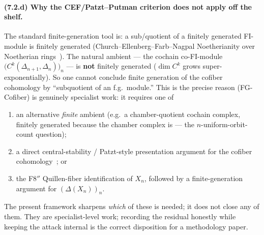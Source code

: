 \documentclass[11pt,reqno]{amsart}
\theoremstyle{plain}
\theoremstyle{definition}
\newcommand{\FGC}{\textup{(FG-Cofiber)}}
\begin{document}
\paragraph{(7.2.d) Why the CEF/Patzt--Putman criterion does not apply
off the shelf.}
The standard finite-generation tool is: a sub/quotient of a finitely
generated FI-module is finitely generated
(Church--Ellenberg--Farb--Nagpal Noetherianity over Noetherian
rings~\cite{CEFN2014}). The natural ambient --- the cochain
co-FI-module $\bigl(C^k(\Delta_{n+1},\Delta_n)\bigr)_n$ --- is
\textbf{not} finitely generated ($\dim C^k$ grows
super-exponentially). So one cannot conclude finite generation of the
cofiber cohomology by ``subquotient of an f.g.\ module.'' This is the
precise reason \FGC{} is genuinely specialist work: it requires one of
\begin{enumerate}[leftmargin=2em,label=(\roman*)]
  \item an alternative \emph{finite} ambient (e.g.\ a chamber-quotient
        cochain complex, finitely generated because the chamber complex
        is --- the $n$-uniform-orbit-count question);
  \item a direct central-stability / Patzt-style presentation argument
        for the cofiber cohomology~\cite{Putman2015,Patzt2017}; or
  \item the F8$''$ Quillen-fiber identification of $X_n$, followed by a
        finite-generation argument for $(\Delta(X_n))_n$.
\end{enumerate}
The present framework sharpens \emph{which} of these is needed; it does
not close any of them. They are specialist-level work; recording the
residual honestly while keeping the attack internal is the correct
disposition for a methodology paper.
\end{document}
